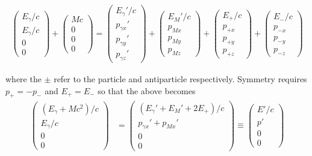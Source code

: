 \documentclass[12pt]{article}
\begin{document}
\begin{align*}
\left(\begin{matrix}
E_\gamma/c \\
E_\gamma/c \\
0 \\
0
\end{matrix}\right) +
\left(\begin{matrix}
Mc \\
0 \\
0 \\
0
\end{matrix}\right) =
\left(\begin{matrix}
E_\gamma'/c \\
p_{\gamma x}' \\
p_{\gamma y}' \\
p_{\gamma z}'
\end{matrix}\right) +
\left(\begin{matrix}
E_M'/c\\
p_{Mx} \\
p_{My} \\
p_{Mz}
\end{matrix}\right) +
\left(\begin{matrix}
E_+/c \\
p_{+x} \\
p_{+y} \\
p_{+z}
\end{matrix}\right) +
\left(\begin{matrix}
E_-/c \\
p_{-x} \\
p_{-y} \\
p_{-z}
\end{matrix}\right)
\end{align*}

where the \(\pm\) refer to the particle and antiparticle respectively. Symmetry requires \(p_+ = -p_-\) and \(E_+ = E_-\) so that the above becomes
\begin{align*}
\left(\begin{matrix}
(E_\gamma+Mc^2)/c \\
E_\gamma/c \\
0 \\
0
\end{matrix}\right)&=
\left(\begin{matrix}
(E_\gamma'+E_M' +2E_+)/c \\
p_{\gamma x}'+p_{Mx}' \\
0 \\
0
\end{matrix}\right)
\equiv \left(\begin{matrix}
E'/c \\
p' \\
0 \\
0
\end{matrix}\right)
\end{align*}
\end{document}
